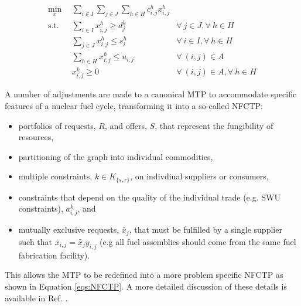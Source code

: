 \begin{subequations}\label{eqs:MCTP}
  \begin{align}
    \min_{x} \:\: & 
    \sum_{i \in I}\sum_{j \in J}\sum_{h \in H} c_{i,j}^{h} x_{i,j}^{h}
    & \label{eqs:MCTP_obj} \\
    \text{s.t.} \:\: 
    &
    \sum_{i \in I} x_{i,j}^{h} \geq d_{j}^{h}
    & 
    \forall \: j \in J, \forall \: h \in H \label{eqs:MCTP_dem} \\
    &
    \sum_{j \in J} x_{i,j}^{h} \leq s_{i}^{h}
    &
    \forall \: i \in I, \forall \: h \in H \label{eqs:MCTP_sup} \\
    &
    \sum_{h \in H} x_{i,j}^{h} \leq u_{i,j}
    & 
    \forall \: (i, j) \in A \label{eqs:MCTP_cap} \\
    &
    x_{i,j}^{k} \geq 0
    &
    \forall \: (i, j) \in A, \forall \: h \in H \label{eqs:MCTP_x}
  \end{align}
\end{subequations}


A number of adjustments are made to a canonical MTP to accommodate specific
features of a nuclear fuel cycle, transforming it into a so-called
\gls{NFCTP}:

\begin{itemize}
\item portfolios of requests, $R$, and offers, $S$, that represent the
  fungibility of resources,
\item partitioning of the graph into individual commodities,
\item multiple constraints, $k \in K_{\{s,r\}}$, on indivdiual suppliers or consumers,
\item constraints that depend on the quality of the individual trade (e.g. SWU
  constraints), $a_{i,j}^k$, and
\item mutually exclusive requests, $\tilde{x_j}$, that must be fulfilled by a
  single supplier such that $x_{i,j} = \tilde{x_j} y_{i,j}$ (e.g all fuel
  assemblies should come from the same fuel fabrication facility).
\end{itemize}
This allows the \gls{MTP} to be redefined into a more problem specific
\gls{NFCTP} as shown in Equation \ref{eqs:NFCTP}.  A more detailed discussion
of these details is available in Ref. .

